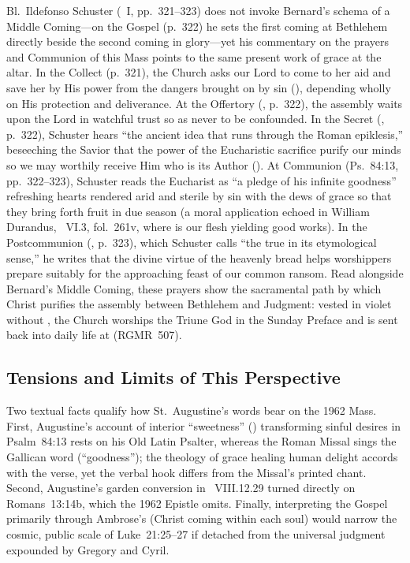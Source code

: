 Bl.~Ildefonso Schuster (~I, pp.~321--323) does not invoke Bernard's schema of a Middle Coming---on the Gospel (p.~322) he sets the first coming at Bethlehem directly beside the second coming in glory---yet his commentary on the prayers and Communion of this Mass points to the same present work of grace at the altar. In the Collect (p.~321), the Church asks our Lord to come to her aid and save her by His power from the dangers brought on by sin (), depending wholly on His protection and deliverance. At the Offertory (, p.~322), the assembly waits upon the Lord in watchful trust so as never to be confounded. In the Secret (, p.~322), Schuster hears ``the ancient idea that runs through the Roman epiklesis,'' beseeching the Savior that the power of the Eucharistic sacrifice purify our minds so we may worthily receive Him who is its Author (). At Communion (Ps.~84:13, pp.~322--323), Schuster reads the Eucharist as ``a pledge of his infinite goodness'' refreshing hearts rendered arid and sterile by sin with the dews of grace so that they bring forth fruit in due season (a moral application echoed in William Durandus, ~VI.3, fol.~261v, where  is our flesh yielding good works). In the Postcommunion (, p.~323), which Schuster calls ``the true  in its etymological sense,'' he writes that the divine virtue of the heavenly bread helps worshippers prepare suitably for the approaching feast of our common ransom. Read alongside Bernard's Middle Coming, these prayers show the sacramental path by which Christ purifies the assembly between Bethlehem and Judgment: vested in violet without , the Church worships the Triune God in the Sunday Preface and is sent back into daily life at  (RGMR~507).

\subsection{Tensions and Limits of This Perspective}

Two textual facts qualify how St.~Augustine's words bear on the 1962 Mass. First, Augustine's account of interior ``sweetness'' () transforming sinful desires in Psalm~84:13 rests on his Old Latin Psalter, whereas the Roman Missal sings the Gallican word  (``goodness''); the theology of grace healing human delight accords with the verse, yet the verbal hook differs from the Missal's printed chant. Second, Augustine's garden conversion in ~VIII.12.29 turned directly on Romans~13:14b, which the 1962 Epistle omits. Finally, interpreting the Gospel primarily through Ambrose's  (Christ coming within each soul) would narrow the cosmic, public scale of Luke~21:25--27 if detached from the universal judgment expounded by Gregory and Cyril.

